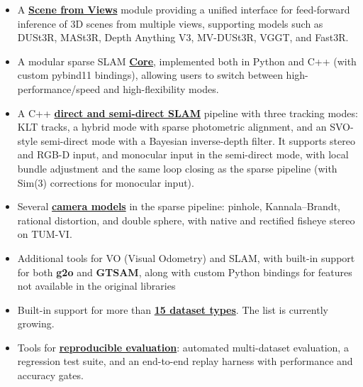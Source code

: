 \documentclass{article}
\begin{document}
\begin{itemize}
    \item A \textbf{\protect\hyperlink{scene-from-views}{Scene from Views}} module providing a unified interface for feed-forward inference of 3D scenes from multiple views, supporting models such as DUSt3R\cite{wang2023dust3r}, MASt3R\cite{leroy2024grounding}, Depth Anything V3\cite{depthanything3}, MV-DUSt3R\cite{tang2025mv}, VGGT\cite{wang2025vggt}, and Fast3R\cite{yang2025fast3r}.
    
    \item A modular sparse SLAM \textbf{\protect\hyperlink{cpp-core}{Core}}, implemented both in Python and C++ (with custom pybind11 bindings), allowing users to switch between high-performance/speed and high-flexibility modes.

    \item A C++ \textbf{\protect\hyperlink{direct-slam}{direct and semi-direct SLAM}} pipeline with three tracking modes: KLT tracks\cite{lucas1981iterative}, a hybrid mode with sparse photometric alignment, and an SVO-style\cite{forster2014svo} semi-direct mode with a Bayesian inverse-depth filter\cite{vogiatzis2011video}. It supports stereo and RGB-D input, and monocular input in the semi-direct mode, with local bundle adjustment and the same loop closing as the sparse pipeline (with Sim(3) corrections for monocular input).

    \item Several \textbf{\protect\hyperlink{camera-models}{camera models}} in the sparse pipeline: pinhole, Kannala--Brandt\cite{kannala2006generic}, rational distortion, and double sphere\cite{usenko2018double}, with native and rectified fisheye stereo on TUM-VI\cite{schubert2018tumvi}.
    
    \item Additional tools for VO (Visual Odometry) and SLAM, with built-in
    support for both \textbf{g2o}\cite{g2o_kummerle} and \textbf{GTSAM}\cite{factor_graphs_for_robot_perception}, along with custom
    Python bindings for features not available in the original libraries

    \item Built-in support for more than \textbf{\protect\hyperlink{datasets}{15 dataset
    types}}. The list is currently growing.

    \item Tools for \textbf{\protect\hyperlink{evaluating-slam}{reproducible evaluation}}: automated multi-dataset evaluation, a regression test suite, and an end-to-end replay harness with performance and accuracy gates.
\end{itemize}
\end{document}
